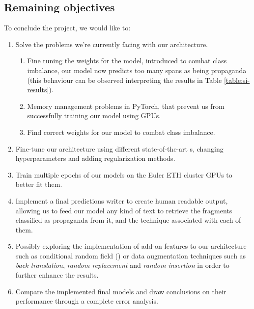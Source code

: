 \subsection*{Remaining objectives}
To conclude the project, we would like to:
\begin{enumerate}
    \item Solve the problems we're currently facing with our architecture. 
    \begin{enumerate}
        \item Fine tuning the weights for the  model, introduced to combat class imbalance, our model now predicts too many spans as being propaganda (this behaviour can be observed interpreting the results in Table \ref{table:si-results}).
        \item Memory management problems in PyTorch, that prevent us from successfully training our model using GPUs.
        \item Find correct weights for our  model to combat class imbalance.
    \end{enumerate}
    \item Fine-tune our architecture using different state-of-the-art s, changing hyperparameters and adding regularization methods.
    \item Train multiple epochs of our models on the Euler ETH cluster GPUs to better fit them.
    \item Implement a final predictions writer to create human readable output, allowing us to feed our model any kind of text to retrieve the fragments classified as propaganda from it, and the technique associated with each of them.
    \item Possibly exploring the implementation of add-on features to our architecture such as conditional random field () or data augmentation techniques such as \textit{back translation}, \textit{random replacement} and \textit{random insertion} in order to further enhance the results.
    \item Compare the implemented final models and draw conclusions on their performance through a complete error analysis.
\end{enumerate}